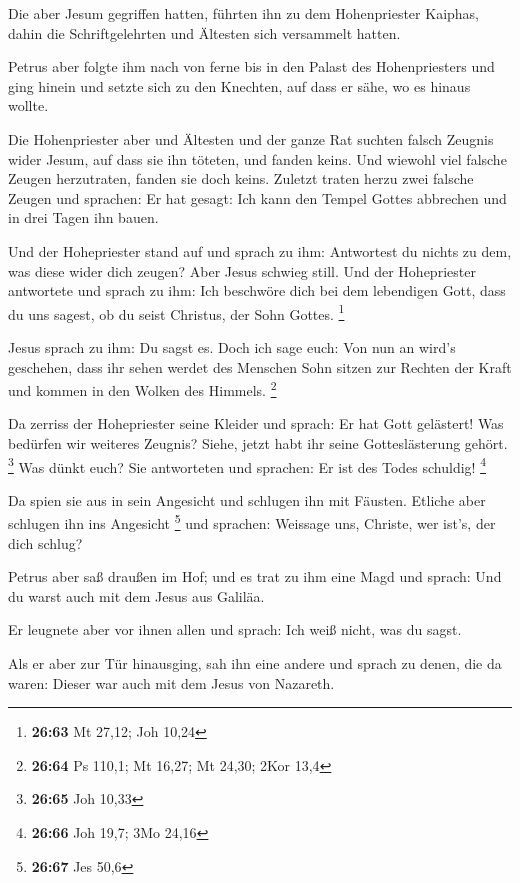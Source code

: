  Die aber Jesum gegriffen hatten, führten ihn zu dem
Hohenpriester Kaiphas, dahin die Schriftgelehrten und Ältesten sich
versammelt hatten.

 Petrus aber folgte ihm nach von ferne bis in den Palast
des Hohenpriesters und ging hinein und setzte sich zu den Knechten, auf
dass er sähe, wo es hinaus wollte.

 Die Hohenpriester aber und Ältesten und der ganze Rat
suchten falsch Zeugnis wider Jesum, auf dass sie ihn töteten,
 und fanden keins. Und wiewohl viel falsche Zeugen
herzutraten, fanden sie doch keins. Zuletzt traten herzu zwei falsche
Zeugen  und sprachen: Er hat gesagt: Ich kann den Tempel
Gottes abbrechen und in drei Tagen ihn bauen.

 Und der Hohepriester stand auf und sprach zu ihm:
Antwortest du nichts zu dem, was diese wider dich zeugen?
 Aber Jesus schwieg still. Und der Hohepriester
antwortete und sprach zu ihm: Ich beschwöre dich bei dem lebendigen
Gott, dass du uns sagest, ob du seist Christus, der Sohn Gottes.
\footnote{\textbf{26:63} Mt 27,12; Joh 10,24}

 Jesus sprach zu ihm: Du sagst es. Doch ich sage euch:
Von nun an wird's geschehen, dass ihr sehen werdet des Menschen Sohn
sitzen zur Rechten der Kraft und kommen in den Wolken des Himmels.
\footnote{\textbf{26:64} Ps 110,1; Mt 16,27; Mt 24,30; 2Kor 13,4}

 Da zerriss der Hohepriester seine Kleider und sprach: Er
hat Gott gelästert! Was bedürfen wir weiteres Zeugnis? Siehe, jetzt habt
ihr seine Gotteslästerung gehört. \footnote{\textbf{26:65} Joh 10,33}
 Was dünkt euch? Sie antworteten und sprachen: Er ist des
Todes schuldig! \footnote{\textbf{26:66} Joh 19,7; 3Mo 24,16}

 Da spien sie aus in sein Angesicht und schlugen ihn mit
Fäusten. Etliche aber schlugen ihn ins Angesicht \footnote{\textbf{26:67}
  Jes 50,6}  und sprachen: Weissage uns, Christe, wer
ist's, der dich schlug?

 Petrus aber saß draußen im Hof; und es trat zu ihm eine
Magd und sprach: Und du warst auch mit dem Jesus aus Galiläa.

 Er leugnete aber vor ihnen allen und sprach: Ich weiß
nicht, was du sagst.

 Als er aber zur Tür hinausging, sah ihn eine andere und
sprach zu denen, die da waren: Dieser war auch mit dem Jesus von
Nazareth.

